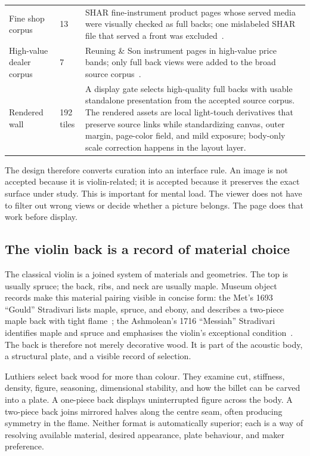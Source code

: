 \documentclass[12pt,letterpaper]{article}
\begin{document}
\begin{table}[H]
\begin{tabular}{p{}p{}p{}}
        Fine shop corpus & 13 & SHAR fine-instrument product pages whose served media were visually checked as full backs; one mislabeled SHAR file that served a front was excluded~\cite{shar_fine_violins}. \\
        High-value dealer corpus & 7 & Reuning \& Son instrument pages in high-value price bands; only full back views were added to the broad source corpus~\cite{reuning_violins}. \\
        Rendered wall & 192 tiles & A display gate selects high-quality full backs with usable standalone presentation from the accepted source corpus. The rendered assets are local light-touch derivatives that preserve source links while standardizing canvas, outer margin, page-color field, and mild exposure; body-only scale correction happens in the layout layer. \\
        \bottomrule
    \end{tabular}
\end{table}

The design therefore converts curation into an interface rule. An image is not accepted because it is violin-related; it is accepted because it preserves the exact surface under study. This is important for mental load. The viewer does not have to filter out wrong views or decide whether a picture belongs. The page does that work before display.

\subsection{The violin back is a record of material choice}

The classical violin is a joined system of materials and geometries. The top is usually spruce; the back, ribs, and neck are usually maple. Museum object records make this material pairing visible in concise form: the Met's 1693 ``Gould'' Stradivari lists maple, spruce, and ebony, and describes a two-piece maple back with tight flame~\cite{met_gould_1693}; the Ashmolean's 1716 ``Messiah'' Stradivari identifies maple and spruce and emphasises the violin's exceptional condition~\cite{ashmolean_messiah_1716}. The back is therefore not merely decorative wood. It is part of the acoustic body, a structural plate, and a visible record of selection.

Luthiers select back wood for more than colour. They examine cut, stiffness, density, figure, seasoning, dimensional stability, and how the billet can be carved into a plate. A one-piece back displays uninterrupted figure across the body. A two-piece back joins mirrored halves along the centre seam, often producing symmetry in the flame. Neither format is automatically superior; each is a way of resolving available material, desired appearance, plate behaviour, and maker preference.
\end{document}
